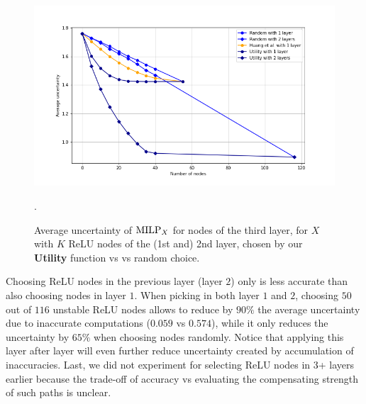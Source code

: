 \begin{figure}[h!]
	\centering
	\vspace*{-0.3cm}
	\includegraphics[height=7.5cm]{Plot for table 3}.
	\vspace*{-0.4cm}
	\caption{Average uncertainty of ${\textrm{MILP}}_X$ for nodes of the third layer, for $X$ with $K$ ReLU nodes of the (1st and) 2nd layer, chosen by our {\bf Utility} function vs \cite{ DivideAndSlide} vs random choice.}
	\label{fig_table3}
\end{figure}


\iffalse
Choosing ReLU nodes in the previous layer (layer $2$) only is less accurate than 
also choosing nodes in layer $1$. When picking in both layer $1$ and $2$, choosing $50$ out of $116$ unstable ReLU nodes allows to reduce by $90\%$ the average uncertainty due to inaccurate computations ($0.059$ vs $0.574$), while it only reduces the uncertainty by $65\%$ when choosing nodes randomly. Notice that applying this layer after layer will even further reduce uncertainty created by accumulation of inaccuracies. 
Last, we did not experiment for selecting ReLU nodes in 3+ layers earlier because the trade-off of accuracy vs evaluating the compensating strength of such paths is unclear.

